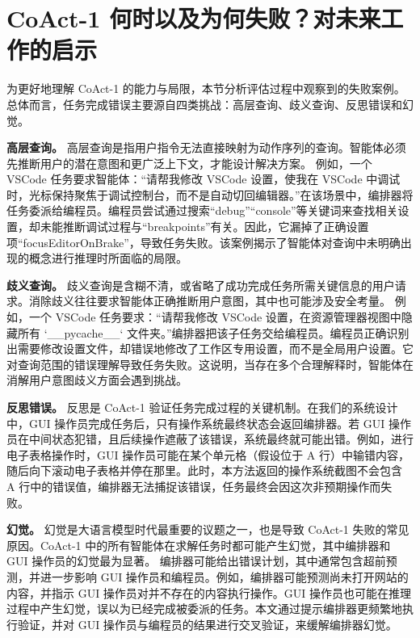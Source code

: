 \documentclass{article} %
\newcommand{\ours}{CoAct-1\xspace}
\begin{document}
\section{\ours 何时以及为何失败？对未来工作的启示}
为更好地理解 \ours 的能力与局限，本节分析评估过程中观察到的失败案例。总体而言，任务完成错误主要源自四类挑战：高层查询、歧义查询、反思错误和幻觉。

\textbf{高层查询。} 高层查询是指用户指令无法直接映射为动作序列的查询。智能体必须先推断用户的潜在意图和更广泛上下文，才能设计解决方案。
例如，一个 VSCode 任务要求智能体：“请帮我修改 VSCode 设置，使我在 VSCode 中调试时，光标保持聚焦于调试控制台，而不是自动切回编辑器。”在该场景中，编排器将任务委派给编程员。编程员尝试通过搜索“debug”“console”等关键词来查找相关设置，却未能推断调试过程与“breakpoints”有关。因此，它漏掉了正确设置项“focusEditorOnBrake”，导致任务失败。该案例揭示了智能体对查询中未明确出现的概念进行推理时所面临的局限。

\textbf{歧义查询。}
歧义查询是含糊不清，或省略了成功完成任务所需关键信息的用户请求。消除歧义往往要求智能体正确推断用户意图，其中也可能涉及安全考量。
例如，一个 VSCode 任务要求：“请帮我修改 VSCode 设置，在资源管理器视图中隐藏所有 `\_\_pycache\_\_` 文件夹。”编排器把该子任务交给编程员。编程员正确识别出需要修改设置文件，却错误地修改了工作区专用设置，而不是全局用户设置。它对查询范围的错误理解导致任务失败。这说明，当存在多个合理解释时，智能体在消解用户意图歧义方面会遇到挑战。

\textbf{反思错误。}
反思是 \ours 验证任务完成过程的关键机制。在我们的系统设计中，GUI 操作员完成任务后，只有操作系统最终状态会返回编排器。若 GUI 操作员在中间状态犯错，且后续操作遮蔽了该错误，系统最终就可能出错。例如，进行电子表格操作时，GUI 操作员可能在某个单元格（假设位于 A 行）中输错内容，随后向下滚动电子表格并停在那里。此时，本方法返回的操作系统截图不会包含 A 行中的错误值，编排器无法捕捉该错误，任务最终会因这次非预期操作而失败。

\textbf{幻觉。}
幻觉是大语言模型时代最重要的议题之一，也是导致 \ours 失败的常见原因。\ours 中的所有智能体在求解任务时都可能产生幻觉，其中编排器和 GUI 操作员的幻觉最为显著。
编排器可能给出错误计划，其中通常包含超前预测，并进一步影响 GUI 操作员和编程员。例如，编排器可能预测尚未打开网站的内容，并指示 GUI 操作员对并不存在的内容执行操作。GUI 操作员也可能在推理过程中产生幻觉，误以为已经完成被委派的任务。本文通过提示编排器更频繁地执行验证，并对 GUI 操作员与编程员的结果进行交叉验证，来缓解编排器幻觉。
\end{document}

